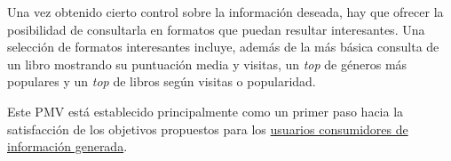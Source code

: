 Una vez obtenido cierto control sobre la información deseada, hay que ofrecer la posibilidad de consultarla en formatos que puedan resultar interesantes. Una selección de formatos interesantes incluye, además de la más básica consulta de un libro mostrando su puntuación media y visitas, un \textit{top} de géneros más populares y un \textit{top} de libros según visitas o popularidad.

Este PMV está establecido principalmente como un primer paso hacia la satisfacción de los objetivos propuestos para los \href{https://github.com/Anglepi/My-Many-Reads/blob/main/docs/md/personas/information-consumer.md}{usuarios consumidores de información generada}.